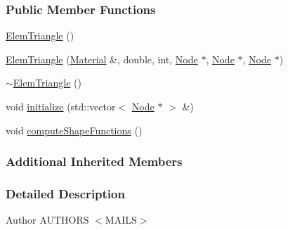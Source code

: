 \subsubsection*{Public Member Functions}
\begin{DoxyCompactItemize}
\item 
\hyperlink{classmknix_1_1_elem_triangle_a3f2e00ba6769185cc6dc8f11f073d5cd}{Elem\-Triangle} ()
\item 
\hyperlink{classmknix_1_1_elem_triangle_a01f7c2e3827dcfbc657b17aa6610b8dc}{Elem\-Triangle} (\hyperlink{classmknix_1_1_material}{Material} \&, double, int, \hyperlink{classmknix_1_1_node}{Node} $\ast$, \hyperlink{classmknix_1_1_node}{Node} $\ast$, \hyperlink{classmknix_1_1_node}{Node} $\ast$)
\item 
\hyperlink{classmknix_1_1_elem_triangle_a7a29ea213e5eb2567702ab1cd01468c4}{$\sim$\-Elem\-Triangle} ()
\item 
void \hyperlink{classmknix_1_1_elem_triangle_a5ddf93646f4b35632801fd28bc8e14a2}{initialize} (std\-::vector$<$ \hyperlink{classmknix_1_1_node}{Node} $\ast$ $>$ \&)
\item 
void \hyperlink{classmknix_1_1_elem_triangle_a6d97673aa922fca3c84ae23255b76223}{compute\-Shape\-Functions} ()
\end{DoxyCompactItemize}
\subsubsection*{Additional Inherited Members}


\subsubsection{Detailed Description}
\begin{DoxyAuthor}{Author}
A\-U\-T\-H\-O\-R\-S $<$\-M\-A\-I\-L\-S$>$ 
\end{DoxyAuthor}



